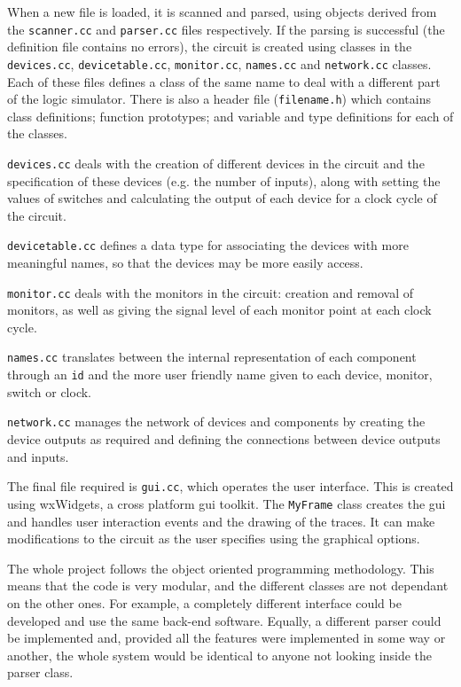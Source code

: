 \documentclass[a4paper,10pt]{article}  %
\begin{document}
When a new file is loaded, it is scanned and parsed, using objects
derived from the \texttt{scanner.cc} and \texttt{parser.cc} files
respectively. If the parsing is successful (the definition file
contains no errors), the circuit is created using classes in the
\texttt{devices.cc}, \texttt{devicetable.cc}, \texttt{monitor.cc},
\texttt{names.cc} and \texttt{network.cc} classes. Each of these files
defines a class of the same name to deal with a different part of the logic
simulator. There is also a header file (\texttt{filename.h}) which
contains class definitions; function prototypes; and variable and type
definitions for each of the classes.

\texttt{devices.cc} deals with the creation of different
devices in the circuit and the specification of these devices
(e.g. the number of inputs), along with setting the values of switches
and calculating the output of each device for a clock cycle of the circuit.

\texttt{devicetable.cc} defines a data type for associating the
devices with more meaningful names, so that the devices may be more
easily access.

\texttt{monitor.cc} deals with the monitors in the circuit: creation
and removal of monitors, as well as giving the signal level of each
monitor point at each clock cycle.

\texttt{names.cc} translates between the internal representation of
each component through an \texttt{id} and the more user friendly name
given to each device, monitor, switch or clock.

\texttt{network.cc} manages the network of devices and components by
creating the device outputs as required and defining the connections
between device outputs and inputs.

The final file required is \texttt{gui.cc}, which operates the user
interface. This is created using wxWidgets, a cross platform gui
toolkit. The \texttt{MyFrame} class creates the gui and handles user
interaction events and the drawing of the traces. It can make
modifications to the circuit as the user specifies using the graphical
options.

The whole project follows the object oriented programming
methodology. This means that the code is very modular, and the
different classes are not dependant on the other ones. For example, a
completely different interface could be developed and use the same
back-end software. Equally, a different parser could be implemented
and, provided all the features were implemented in some way or
another, the whole system would be identical to anyone not looking
inside the parser class.
\end{document}
